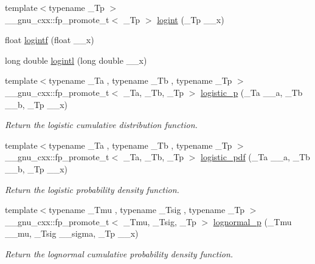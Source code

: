 \begin{DoxyCompactItemize}
\item 
{\footnotesize template$<$typename \+\_\+\+Tp $>$ }\\\+\_\+\+\_\+gnu\+\_\+cxx\+::fp\+\_\+promote\+\_\+t$<$ \+\_\+\+Tp $>$ \hyperlink{group__gnu__math__spec__func_ga1c0fe0f4cb72041f24db82dc7e47df11}{logint} (\+\_\+\+Tp \+\_\+\+\_\+x)
\item 
float \hyperlink{group__gnu__math__spec__func_gab878da3ba2f5c1d49d96eadde533b233}{logintf} (float \+\_\+\+\_\+x)
\item 
long double \hyperlink{group__gnu__math__spec__func_gab17f5cadc8f77ba2666d0d5ecc78de5d}{logintl} (long double \+\_\+\+\_\+x)
\item 
{\footnotesize template$<$typename \+\_\+\+Ta , typename \+\_\+\+Tb , typename \+\_\+\+Tp $>$ }\\\+\_\+\+\_\+gnu\+\_\+cxx\+::fp\+\_\+promote\+\_\+t$<$ \+\_\+\+Ta, \+\_\+\+Tb, \+\_\+\+Tp $>$ \hyperlink{group__gnu__math__spec__func_ga5a5d9c5e7ab822f84578415be8609f49}{logistic\+\_\+p} (\+\_\+\+Ta \+\_\+\+\_\+a, \+\_\+\+Tb \+\_\+\+\_\+b, \+\_\+\+Tp \+\_\+\+\_\+x)
\begin{DoxyCompactList}\small\item\em Return the logistic cumulative distribution function. \end{DoxyCompactList}\item 
{\footnotesize template$<$typename \+\_\+\+Ta , typename \+\_\+\+Tb , typename \+\_\+\+Tp $>$ }\\\+\_\+\+\_\+gnu\+\_\+cxx\+::fp\+\_\+promote\+\_\+t$<$ \+\_\+\+Ta, \+\_\+\+Tb, \+\_\+\+Tp $>$ \hyperlink{group__gnu__math__spec__func_gaeb3e768c11c8cd11804827a09f19b1e3}{logistic\+\_\+pdf} (\+\_\+\+Ta \+\_\+\+\_\+a, \+\_\+\+Tb \+\_\+\+\_\+b, \+\_\+\+Tp \+\_\+\+\_\+x)
\begin{DoxyCompactList}\small\item\em Return the logistic probability density function. \end{DoxyCompactList}\item 
{\footnotesize template$<$typename \+\_\+\+Tmu , typename \+\_\+\+Tsig , typename \+\_\+\+Tp $>$ }\\\+\_\+\+\_\+gnu\+\_\+cxx\+::fp\+\_\+promote\+\_\+t$<$ \+\_\+\+Tmu, \+\_\+\+Tsig, \+\_\+\+Tp $>$ \hyperlink{group__gnu__math__spec__func_ga3bbd4feb10f2d745bf8aca8748099c53}{lognormal\+\_\+p} (\+\_\+\+Tmu \+\_\+\+\_\+mu, \+\_\+\+Tsig \+\_\+\+\_\+sigma, \+\_\+\+Tp \+\_\+\+\_\+x)
\begin{DoxyCompactList}\small\item\em Return the lognormal cumulative probability density function. \end{DoxyCompactList}\item 

\end{DoxyCompactItemize}

